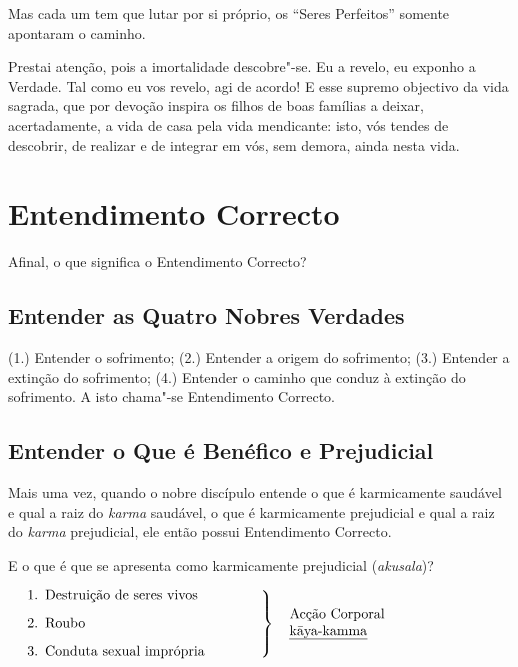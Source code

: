 
Mas cada um tem que lutar por si próprio, os “Seres Perfeitos” somente
apontaram o caminho.


Prestai atenção, pois a imortalidade descobre"-se. Eu a revelo, eu exponho a
Verdade. Tal como eu vos revelo, agi de acordo! E esse supremo objectivo da
vida sagrada, que por devoção inspira os filhos de boas famílias a deixar,
acertadamente, a vida de casa pela vida mendicante: isto, vós tendes de
descobrir, de realizar e de integrar em vós, sem demora, ainda nesta vida.


\clearpage

\section{Entendimento Correcto}



Afinal, o que significa o Entendimento Correcto?

\subsection{Entender as Quatro Nobres Verdades}

(1.) Entender o sofrimento;
(2.) Entender a origem do sofrimento;
(3.) Entender a extinção do sofrimento;
(4.) Entender o caminho que conduz à extinção do sofrimento.
A isto chama"-se Entendimento Correcto.


\subsection{Entender o Que é Benéfico e Prejudicial}

Mais uma vez, quando o nobre discípulo entende o que é karmicamente saudável e
qual a raiz do \emph{karma} saudável, o que é karmicamente prejudicial e qual a
raiz do \emph{karma} prejudicial, ele então possui Entendimento Correcto.

E o que é que se apresenta como karmicamente prejudicial (\emph{akusala})?

\bigskip

$\left.
\begin{minipage}{0.52\linewidth}
\raggedright
\begin{enumerate}
  \item Destruição de seres vivos
  \item Roubo
  \item Conduta sexual imprópria
\end{enumerate}
\end{minipage}
\right\}
\hspace*{10pt}\parbox{0.4\linewidth}{Acção Corporal\\ \emph{kāya-kamma}}
$

